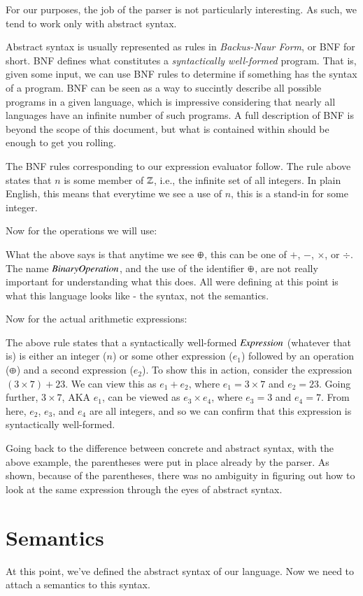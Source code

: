 \documentclass[nocopyrightspace]{sigplanconf}
\begin{document}
For our purposes, the job of the parser is not particularly interesting.
As such, we tend to work only with abstract syntax.

Abstract syntax is usually represented as rules in \emph{Backus-Naur Form}, or BNF for short.
BNF defines what constitutes a \emph{syntactically well-formed} program.
That is, given some input, we can use BNF rules to determine if something has the syntax of a program.
BNF can be seen as a way to succintly describe all possible programs in a given language, which is impressive considering that nearly all languages have an infinite number of such programs.
A full description of BNF is beyond the scope of this document, but what is contained within should be enough to get you rolling.

The BNF rules corresponding to our expression evaluator follow.
The rule above states that $n$ is some member of $\mathbb{Z}$, i.e., the infinite set of all integers.
In plain English, this means that everytime we see a use of $n$, this is a stand-in for some integer.

Now for the operations we will use:
\framed[]{
  \begin{align*}
    \bop \in \BinOp &::= + | - | \times | \div
  \end{align*}
}

What the above says is that anytime we see $\oplus$, this can be one of $+$, $-$, $\times$, or $\div$.
The name $\mathit{BinaryOperation}$, and the use of the identifier $\oplus$, are not really important for understanding what this does.
All were defining at this point is what this language looks like - the syntax, not the semantics.

Now for the actual arithmetic expressions:

The above rule states that a syntactically well-formed $\mathit{Expression}$ (whatever that is) is either an integer ($n$) or some other expression ($e_1$) followed by an operation ($\oplus$) and a second expression ($e_2$).
To show this in action, consider the expression $(3 \times 7) + 23$.
We can view this as $e_1 + e_2$, where $e_1 = 3 \times 7$ and $e_2 = 23$.
Going further, $3 \times 7$, AKA $e_1$, can be viewed as $e_3 \times e_4$, where $e_3 = 3$ and $e_4 = 7$.
From here, $e_2$, $e_3$, and $e_4$ are all integers, and so we can confirm that this expression is syntactically well-formed.

Going back to the difference between concrete and abstract syntax, with the above example, the parentheses were put in place already by the parser.
As shown, because of the parentheses, there was no ambiguity in figuring out how to look at the same expression through the eyes of abstract syntax.

\section{Semantics}
At this point, we've defined the abstract syntax of our language.
Now we need to attach a semantics to this syntax.
\end{document}
